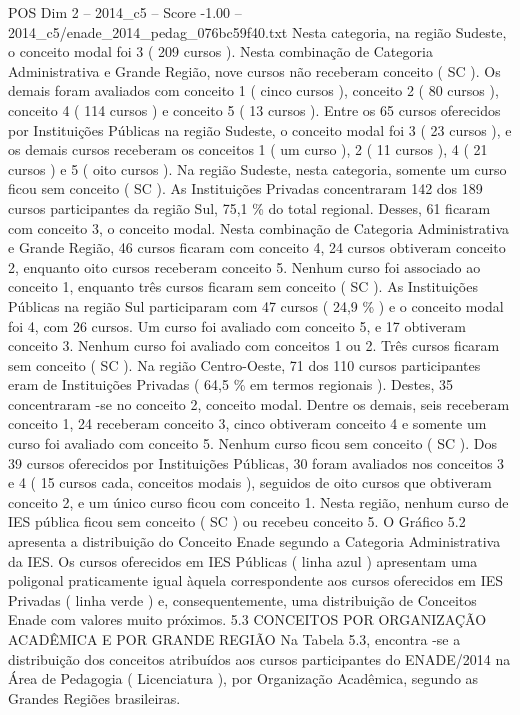 \begin{textsample}{POS Dim 2 – 2014\_c5 – Score -1.00 – 2014\_c5/enade\_2014\_pedag\_076bc59f40.txt}
Nesta categoria, na região Sudeste, o conceito modal foi 3 ( 209 cursos ).
Nesta combinação de Categoria Administrativa e Grande Região, nove cursos não receberam conceito ( SC ).
Os demais foram avaliados com conceito 1 ( cinco cursos ), conceito 2 ( 80 cursos ), conceito 4 ( 114 cursos ) e conceito 5 ( 13 cursos ).
Entre os 65 cursos oferecidos por Instituições Públicas na região Sudeste, o conceito modal foi 3 ( 23 cursos ), e os demais cursos receberam os conceitos 1 ( um curso ), 2 ( 11 cursos ), 4 ( 21 cursos ) e 5 ( oito cursos ).
Na região Sudeste, nesta categoria, somente um curso ficou sem conceito ( SC ).
As Instituições Privadas concentraram 142 dos 189 cursos participantes da região Sul, 75,1 \% do total regional.
Desses, 61 ficaram com conceito 3, o conceito modal.
Nesta combinação de Categoria Administrativa e Grande Região, 46 cursos ficaram com conceito 4, 24 cursos obtiveram conceito 2, enquanto oito cursos receberam conceito 5.
Nenhum curso foi associado ao conceito 1, enquanto três cursos ficaram sem conceito ( SC ).
As Instituições Públicas na região Sul participaram com 47 cursos ( 24,9 \% ) e o conceito modal foi 4, com 26 cursos.
Um curso foi avaliado com conceito 5, e 17 obtiveram conceito 3.
Nenhum curso foi avaliado com conceitos 1 ou 2.
Três cursos ficaram sem conceito ( SC ).
Na região Centro-Oeste, 71 dos 110 cursos participantes eram de Instituições Privadas ( 64,5 \% em termos regionais ).
Destes, 35 concentraram -se no conceito 2, conceito modal.
Dentre os demais, seis receberam conceito 1, 24 receberam conceito 3, cinco obtiveram conceito 4 e somente um curso foi avaliado com conceito 5.
Nenhum curso ficou sem conceito ( SC ).
Dos 39 cursos oferecidos por Instituições Públicas, 30 foram avaliados nos conceitos 3 e 4 ( 15 cursos cada, conceitos modais ), seguidos de oito cursos que obtiveram conceito 2, e um único curso ficou com conceito 1.
Nesta região, nenhum curso de IES pública ficou sem conceito ( SC ) ou recebeu conceito 5.
O Gráfico 5.2 apresenta a distribuição do Conceito Enade segundo a Categoria Administrativa da IES.
Os cursos oferecidos em IES Públicas ( linha azul ) apresentam uma poligonal praticamente igual àquela correspondente aos cursos oferecidos em IES Privadas ( linha verde ) e, consequentemente, uma distribuição de Conceitos Enade com valores muito próximos. 5.3 CONCEITOS POR ORGANIZAÇÃO ACADÊMICA E POR GRANDE REGIÃO Na Tabela 5.3, encontra -se a distribuição dos conceitos atribuídos aos cursos participantes do ENADE/2014 na Área de Pedagogia ( Licenciatura ), por Organização Acadêmica, segundo as Grandes Regiões brasileiras.

\end{textsample}
